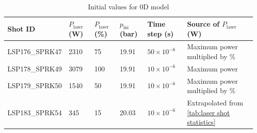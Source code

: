         \begin{table}[!ht]
            \centering
            \caption{Initial values for 0D model}
            \label{tab:Initial values for model}
            \begin{tabularx}{\textwidth}{@{}lX<{\raggedright}X<{\raggedright}X<{\raggedright}X<{\raggedright}X<{\raggedright}@{}}
            \toprule
            Shot ID & $P_\mathrm{laser}$ (\unit{W}) & $P_\mathrm{laser}$ (\unit{\%}) & $p_\mathrm{ini}$ (\unit{bar}) & Time step (\unit{s}) & Source of $P_\mathrm{laser}$ (\unit{W})\\ \midrule
            LSP176\_SPRK47 & 2310      &  75     &    19.91   &  $50\times 10^{-6}$ & Maximum power multiplied by \% \\ 
            LSP178\_SPRK49 & 3079      &  100    &    19.91   &  $10\times 10^{-6}$ & Maximum power\\
            LSP179\_SPRK50 & 1540      &  50     &    19.91   &  $10\times 10^{-6}$ & Maximum power multiplied by \% \\
            LSP183\_SPRK54 & 345       &  15     &    20.03   & $10\times 10^{-6}$  & Extrapolated from \autoref{tab:laser shot statistics}\\ 
            \bottomrule
            \end{tabularx}
        \end{table}